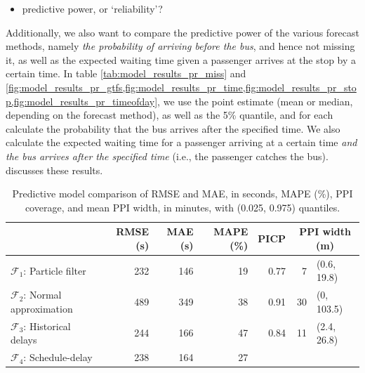 \begin{itemize}
\item predictive power, or `reliability'?
\end{itemize}

Additionally, we also want to compare the predictive power of the various forecast methods, namely \emph{the probability of arriving before the bus}, and hence not missing it, as well as the expected waiting time given a passenger arrives at the stop by a certain time. In table \cref{tab:model_results_pr_miss} and \cref{fig:model_results_pr_gtfs,fig:model_results_pr_time,fig:model_results_pr_stop,fig:model_results_pr_timeofday}, we use the point estimate (mean or median, depending on the forecast method), as well as the 5\% quantile, and for each calculate the probability that the bus arrives after the specified time. We also calculate the expected waiting time for a passenger arriving at a certain time \emph{and the bus arrives after the specified time} (i.e., the passenger catches the bus).  discusses these results.






\begin{knitrout}\small
{}\color{fgcolor}\begin{table}

\caption{\label{tab:model_results_rmse}Predictive model comparison of RMSE and MAE, in seconds, MAPE (\%), PPI coverage, and mean PPI width, in minutes, with (0.025, 0.975) quantiles.}
\centering
\fontsize{8}{10}\selectfont
\begin{tabular}[t]{lrrrrrl}
\toprule
  & RMSE (s) & MAE (s) & MAPE (\%) & PICP & \multicolumn{2}{c}{PPI width (m)} \\
\midrule
$\mathcal{F}_1$: Particle filter & 232 & 146 & 19 & 0.77 & 7 & (0.6, 19.8)\\
$\mathcal{F}_2$: Normal approximation & 489 & 349 & 38 & 0.91 & 30 & (0, 103.5)\\
$\mathcal{F}_3$: Historical delays & 244 & 166 & 47 & 0.84 & 11 & (2.4, 26.8)\\
$\mathcal{F}_4$: Schedule-delay & 238 & 164 & 27 &  &  & \\
\bottomrule
\end{tabular}
\end{table}


\end{knitrout}




